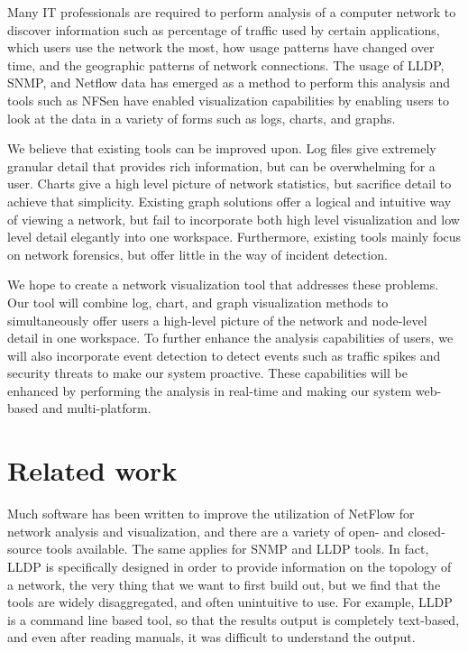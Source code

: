 \documentclass{sig-alternate}
\begin{document}
Many IT professionals are required to perform analysis of a computer network to
discover information such as percentage of traffic used by certain applications,
which users use the network the most, how usage patterns have changed over time,
and the geographic patterns of network connections. The usage of LLDP, SNMP, and
Netflow data has emerged as a method to perform this analysis and tools such as
NFSen have enabled visualization capabilities by enabling users to look at the
data in a variety of forms such as logs, charts, and graphs.

We believe that existing tools can be improved upon. Log files give extremely
granular detail that provides rich information, but can be overwhelming for a
user. Charts give a high level picture of network statistics, but sacrifice
detail to achieve that simplicity. Existing graph solutions offer a logical and
intuitive way of viewing a network, but fail to incorporate both high level
visualization and low level detail elegantly into one workspace. Furthermore,
existing tools mainly focus on network forensics, but offer little in the way of
incident detection.

We hope to create a network visualization tool that addresses these problems.
Our tool will combine log, chart, and graph visualization methods to
simultaneously offer users a high-level picture of the network and node-level
detail in one workspace. To further enhance the analysis capabilities of users,
we will also incorporate event detection to detect events such as traffic spikes
and security threats to make our system proactive. These capabilities will be
enhanced by performing the analysis in real-time and making our system web-based
and multi-platform.

\section{Related work}

Much software has been written to improve the utilization of NetFlow for network
analysis and visualization, and there are a variety of open- and closed-source
tools available. The same applies for SNMP and LLDP tools. In fact, LLDP is
specifically designed in order to provide information on the topology of a
network, the very thing that we want to first build out, but we find that the
tools are widely disaggregated, and often unintuitive to use. For example, LLDP
is a command line based tool, so that the results output is completely
text-based, and even after reading manuals, it was difficult to understand the
output.
\end{document}
